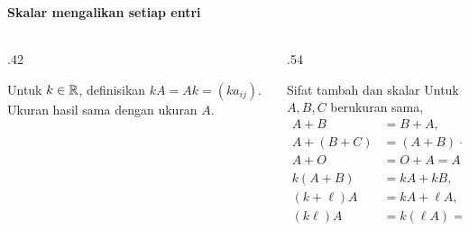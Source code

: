 \documentclass{../../kalkulus-ppt}
\begin{document}
\begin{frame}
    \frametitle{\insertsection}
    \framesubtitle{Skalar mengalikan setiap entri}
    \begin{columns}[c,onlytextwidth]
        \begin{column}{.42\textwidth}
            \begin{definisi}
                Untuk $k\in\mathbb{R}$, definisikan $kA=Ak=(ka_{ij})$. Ukuran hasil sama dengan ukuran $A$.
            \end{definisi}
        \end{column}
        \begin{column}{.54\textwidth}
            \begin{block}{Sifat tambah dan skalar}
                Untuk $A,B,C$ berukuran sama,
                \[
                    \begin{aligned}
                        A+B&=B+A,\\
                        A+(B+C)&=(A+B)+C,\\
                        A+O&=O+A=A,\qquad A-A=O,\\
                        k(A+B)&=kA+kB,\\
                        (k+\ell)A&=kA+\ell A,\\
                        (k\ell)A&=k(\ell A)=\ell(kA).
                    \end{aligned}
                \]
            \end{block}
        \end{column}
    \end{columns}
\end{frame}
\end{document}
